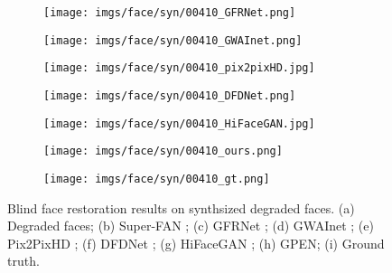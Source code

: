 \documentclass[final]{cvpr}
\begin{document}
\begin{figure*}[ht!]
\begin{subfigure}[t!]{.11\textwidth}
        \texttt{[image: imgs/face/syn/00410\_GFRNet.png]}
        \vspace*{-5mm}
        \caption{}
    \end{subfigure}\begin{subfigure}[t!]{.11\textwidth}
        \texttt{[image: imgs/face/syn/00410\_GWAInet.png]}
        \vspace*{-5mm}
        \caption{}
    \end{subfigure}\begin{subfigure}[t!]{.11\textwidth}
        \texttt{[image: imgs/face/syn/00410\_pix2pixHD.jpg]}
        \vspace*{-5mm}
        \caption{}
    \end{subfigure}\begin{subfigure}[t!]{.11\textwidth}
        \texttt{[image: imgs/face/syn/00410\_DFDNet.png]}
        \vspace*{-5mm}
        \caption{}
    \end{subfigure}\begin{subfigure}[t!]{.11\textwidth}
        \texttt{[image: imgs/face/syn/00410\_HiFaceGAN.jpg]}
        \vspace*{-5mm}
        \caption{}
    \end{subfigure}\begin{subfigure}[t!]{.11\textwidth}
        \texttt{[image: imgs/face/syn/00410\_ours.png]}
        \vspace*{-5mm}
        \caption{}
    \end{subfigure}\begin{subfigure}[t!]{.11\textwidth}
        \texttt{[image: imgs/face/syn/00410\_gt.png]}
        \vspace*{-5mm}
        \caption{}
    \end{subfigure}\vspace*{-3mm}
\caption{Blind face restoration results on synthsized degraded faces. (a) Degraded faces; (b) Super-FAN ; (c) GFRNet ; (d) GWAInet ; (e) Pix2PixHD ; (f) DFDNet ; (g) HiFaceGAN ; (h) GPEN; (i) Ground truth. }
\label{fig:comp}
\vspace*{-3mm}
\end{figure*}
\end{document}
